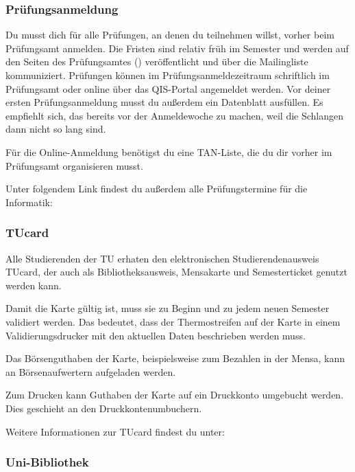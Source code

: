 \begin{multicols}{2}
\subsubsection{Prüfungsanmeldung}
	\label{todoanmeldung}

	Du musst dich für alle Prüfungen, an denen du teilnehmen willst, vorher beim Prüfungsamt anmelden. Die Fristen sind relativ früh im Semester und werden auf den Seiten des Prüfungsamtes () veröffentlicht und über die Mailingliste kommuniziert. Prüfungen können im Prüfungsanmeldezeitraum schriftlich im Prüfungsamt oder online über das QIS-Portal angemeldet werden.
	Vor deiner ersten Prüfungsanmeldung musst du außerdem ein Datenblatt ausfüllen. Es empfiehlt sich, das bereits vor der Anmeldewoche zu machen, weil die Schlangen dann nicht so lang sind.

	Für die Online-Anmeldung benötigst du eine TAN-Liste, die du dir vorher im Prüfungsamt organisieren musst.

	Unter folgendem Link findest du außerdem alle Prüfungstermine für die Informatik:

\subsubsection{TUcard}
	\label{tucard}
	
	Alle Studierenden der TU erhaten den elektronischen Studierendenausweis TUcard, der auch als Bibliotheksausweis, Mensakarte und Semesterticket genutzt werden kann.

	Damit die Karte gültig ist, muss sie zu Beginn und zu jedem neuen Semester validiert werden. Das bedeutet, dass der Thermostreifen auf der Karte in einem Validierungsdrucker mit den aktuellen Daten beschrieben werden muss.

	Das Börsenguthaben der Karte, beispielsweise zum Bezahlen in der Mensa, kann an Börsenaufwertern aufgeladen werden.

	Zum Drucken kann Guthaben der Karte auf ein Druckkonto umgebucht werden. Dies geschieht an den Druckkontenumbuchern.

	Weitere Informationen zur TUcard findest du unter: 

\subsubsection{Uni-Bibliothek}
	\label{todobib}


\end{multicols}
